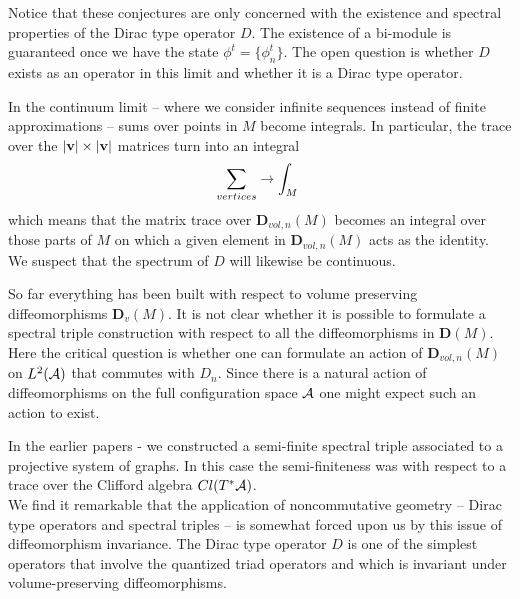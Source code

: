 \documentclass[12pt]{article}
\def\ca{{\cal A}}
\begin{document}
Notice that these conjectures are only concerned with the existence and spectral properties of the Dirac type operator $D$. The existence of a bi-module is guaranteed once we have the state $\phi^t=\{\phi^t_n\}$. The open question is whether $D$ exists as an operator in this limit and whether it is a Dirac type operator.

In the continuum limit  -- where we consider infinite sequences instead of finite approximations -- sums over points in $M$ become integrals. In particular, the trace over the $\vert {\bf v} \vert \times \vert {\bf v} \vert$ matrices turn into an integral
$$
\sum_{\small vertices}\rightarrow\int_M\
$$
which means that
 the matrix trace over $\mathbf{D}_{vol,n}(M)$ becomes an integral over those parts of $M$ on which a given element in $\mathbf{D}_{vol,n}(M)$ acts as the identity. We suspect that the spectrum of $D$ will likewise be continuous. %

So far everything has been built with respect to volume preserving diffeomorphisms $\mathbf{D}_{v}(M)$. It is not clear whether it is possible to formulate a spectral triple construction with respect to all the diffeomorphisms in $\mathbf{D}(M)$. Here the critical question is whether one can formulate an action of $\mathbf{D}_{vol,n}(M)$ on $L^2(\ca)$ that commutes with $D_n$. Since there is a natural action of diffeomorphisms on the full configuration space $\ca$ one might expect such an action to exist.




In the earlier papers \cite{AGN1}-\cite{AGN3} we constructed a semi-finite spectral triple associated to a projective system of graphs. In this case the semi-finiteness was with respect to a trace over the Clifford algebra $Cl(T^*\ca)$.\\





We find it remarkable that the application of noncommutative geometry -- Dirac type operators and spectral triples --  is somewhat forced upon us by this issue of diffeomorphism invariance. The Dirac type operator $D$ is one of the simplest operators that involve the quantized triad operators and which is invariant under volume-preserving diffeomorphisms. \\
\end{document}
